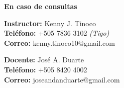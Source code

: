 \vspace*{\fill}
\begin{flushright}
    \textbf{\large En caso de consultas}

    \textbf{Instructor:} Kenny J. Tinoco \\
    \textbf{Teléfono:} +505 7836 3102 \emph{(Tigo)} \\
    \textbf{Correo:} kenny.tinoco10@gmail.com

    \textbf{Docente:} José A. Duarte\\
    \textbf{Teléfono:} +505 8420 4002\\
    \textbf{Correo:} joseandanduarte@gmail.com
\end{flushright}
\vspace*{0cm}